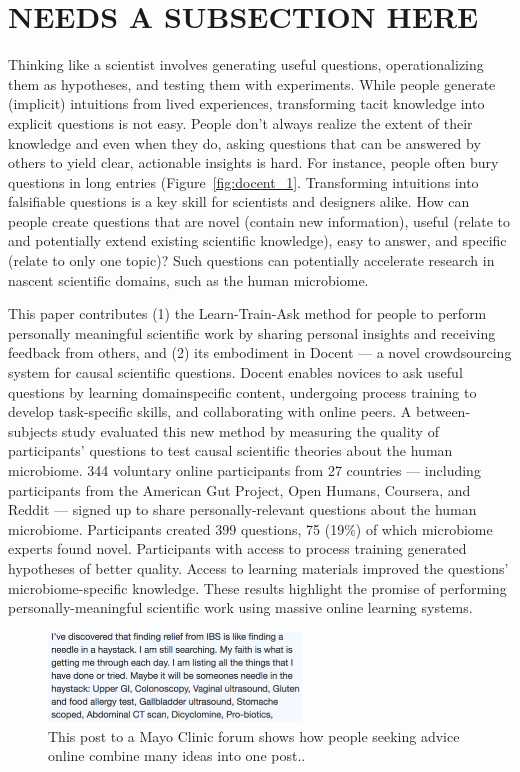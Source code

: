 \section{NEEDS A SUBSECTION HERE}
Thinking like a scientist involves generating useful questions,
operationalizing them as hypotheses, and testing them
with experiments. While people generate (implicit) intuitions
from lived experiences, transforming tacit knowledge into
explicit questions is not easy. People don’t always realize the
extent of their knowledge and even when they do, asking questions 
that can be answered by others to yield clear, actionable
insights is hard. For instance, people often bury
questions in long entries (Figure~\ref{fig:docent_1}. Transforming intuitions
into falsifiable questions is a key skill for scientists and designers
alike. How can people create questions that are novel
(contain new information), useful (relate to and potentially
extend existing scientific knowledge), easy to answer, and
specific (relate to only one topic)? Such questions can
potentially accelerate research in nascent scientific domains,
such as the human microbiome.

This paper contributes (1) the Learn-Train-Ask method for
people to perform personally meaningful scientific work by
sharing personal insights and receiving feedback from
others, and (2) its embodiment in Docent — a novel
crowdsourcing system for causal scientific questions. Docent
enables novices to ask useful questions by learning domainspecific
content, undergoing process training to develop
task-specific skills, and collaborating with online peers. A
between-subjects study evaluated this new method by measuring
the quality of participants’ questions to test causal scientific
theories about the human microbiome. 344 voluntary
online participants from 27 countries — including participants
from the American Gut Project, Open Humans,
Coursera, and Reddit — signed up to share personally-relevant
questions about the human microbiome. Participants
created 399 questions, 75 (19\%) of which microbiome experts
found novel. Participants with access to process training
generated hypotheses of better quality. Access to
learning materials improved the questions’ microbiome-specific
knowledge. These results highlight the promise of performing
personally-meaningful scientific work using
massive online learning systems.

\begin{figure}[h]
  \centering
  \includegraphics[width=0.6\textwidth]{figures/docent/fig-1.png}
  \caption[Post to a Mayo Clinic forum]
{This post to a Mayo Clinic forum shows how people
seeking advice online combine many ideas into one post..}
  \label{fig:docent-1}
\end{figure}


